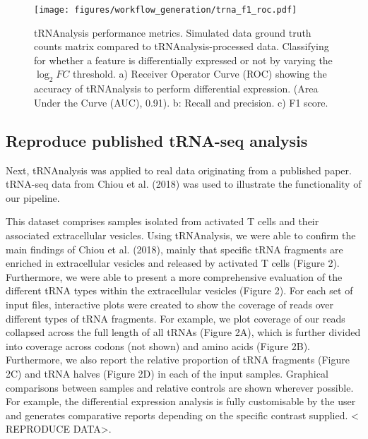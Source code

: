 \begin{figure}[htb]
\centering
\texttt{[image: figures/workflow\_generation/trna\_f1\_roc.pdf]}
\caption[tRNAnalysis performance metrics]{tRNAnalysis performance metrics.
Simulated data ground truth counts matrix compared to tRNAnalysis-processed data.
Classifying for whether a feature is differentially expressed or not by varying the $\log_{2}FC$ threshold.
a) Receiver Operator Curve (ROC) showing the accuracy of tRNAnalysis to perform differential expression. (Area Under the Curve (AUC), 0.91).
b: Recall and precision.
c) F1 score.}
\label{fig:trna_f1_roc}
\end{figure}

\subsection{Reproduce published tRNA-seq analysis}
Next, tRNAnalysis was applied to real data originating from a published paper.
tRNA-seq data from Chiou et al. (2018) \cite{chiou2018selective} was used to illustrate the functionality of our pipeline.

This dataset comprises samples isolated from activated T cells and their associated extracellular vesicles.
Using tRNAnalysis, we were able to confirm the main findings of Chiou et al. (2018), mainly that specific tRNA fragments are enriched in extracellular vesicles and released by activated T cells (Figure 2).
Furthermore, we were able to present a more comprehensive evaluation of the different tRNA types within the extracellular vesicles (Figure 2).
For each set of input files, interactive plots were created to show the coverage of reads over different types of tRNA fragments.
For example, we plot coverage of our reads collapsed across the full length of all tRNAs (Figure 2A), which is further divided into coverage across codons (not shown) and amino acids (Figure 2B).
Furthermore, we also report the relative proportion of tRNA fragments (Figure 2C) and tRNA halves (Figure 2D) in each of the input samples.
Graphical comparisons between samples and relative controls are shown wherever possible.
For example, the differential expression analysis is fully customisable by the user and generates comparative reports depending on the specific contrast supplied.
< REPRODUCE DATA>.